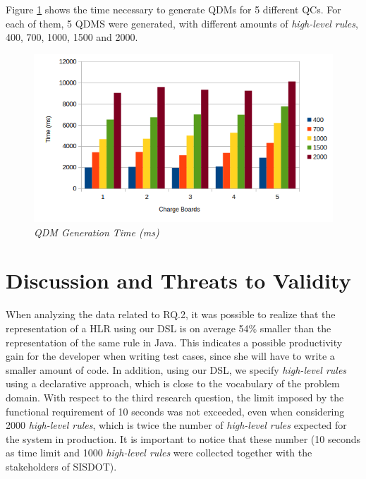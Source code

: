 \documentclass[twocolumn]{bmcart}%
\newcommand{\callers}{\emph{high-level rules}\xspace}
\newcommand{\shc}{HLR\xspace}
\begin{document}
Figure \ref{fig:geracao} shows the time necessary to generate QDMs for 5 different QCs. For each of them, 5 QDMS were generated, with different amounts of \callers, 400, 700, 1000, 1500 and 2000.

\begin{figure}[!ht] \centering
	\includegraphics[width=.45\textwidth]
	{img/artigo_geracao.png}
	\caption{\it QDM Generation Time (ms)}
	\label{fig:geracao}
\end{figure}




\section{Discussion and Threats to Validity}
\label{threats}

When analyzing the data related to RQ.2, it was possible to realize that the representation of a \shc using our DSL is on average 54\% smaller than the representation of the same rule in Java. This indicates a possible productivity gain for the developer when writing test cases, since she will have to write a smaller amount of code. In addition, using our DSL, we specify \callers using a declarative approach, which is close to the vocabulary of the problem domain. With respect to the third research question, the limit imposed by the functional requirement of 10 seconds was not exceeded, even when considering 2000 \callers, which is twice the number of \callers expected for the system in production. It is important to notice that these number (10 seconds as time limit and 1000 \callers were collected together with the stakeholders of SISDOT).
\end{document}
